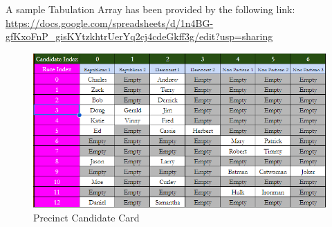 A sample Tabulation Array has been provided by the following link:
\url{https://docs.google.com/spreadsheets/d/1n4BG-gfKxoFnP_gisKYtzkhtrUerYq2cj4cdeGkff3g/edit?usp=sharing}

\begin{figure}[bp!]
\begin{center}
\caption{Precinct Candidate Card}
\includegraphics[width=400pt]{Candidate Card.png}
\end{center}
\end{figure}
\newpage
